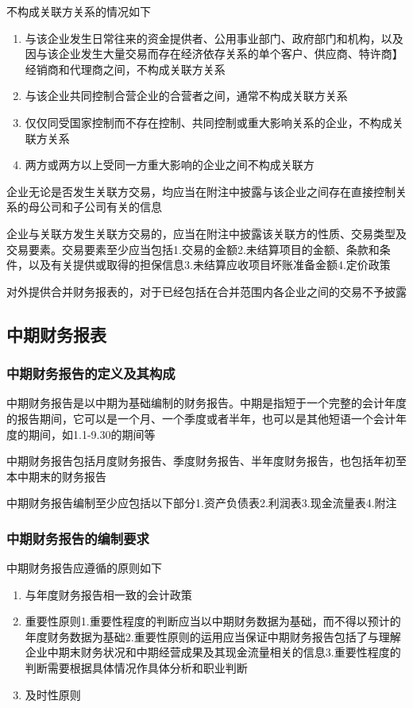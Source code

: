 \documentclass[UTF8,12pt]{ctexart}
\numberwithin{equation}{section} %
\numberwithin{figure}{section}
\numberwithin{table}{section}
\begin{document}
	不构成关联方关系的情况如下
	\begin{enumerate}
		\item 与该企业发生日常往来的资金提供者、公用事业部门、政府部门和机构，以及因与该企业发生大量交易而存在经济依存关系的单个客户、供应商、特许商】经销商和代理商之间，不构成关联方关系
		
		\item 与该企业共同控制合营企业的合营者之间，通常不构成关联方关系
		
		\item 仅仅同受国家控制而不存在控制、共同控制或重大影响关系的企业，不构成关联方关系
		
		\item 两方或两方以上受同一方重大影响的企业之间不构成关联方
	\end{enumerate}
	
	企业无论是否发生关联方交易，均应当在附注中披露与该企业之间存在直接控制关系的母公司和子公司有关的信息
	
	企业与关联方发生关联方交易的，应当在附注中披露该关联方的性质、交易类型及交易要素。交易要素至少应当包括1.交易的金额2.未结算项目的金额、条款和条件，以及有关提供或取得的担保信息3.未结算应收项目坏账准备金额4.定价政策
	
	对外提供合并财务报表的，对于已经包括在合并范围内各企业之间的交易不予披露
	
	\subsection{中期财务报表}
	\subsubsection{中期财务报告的定义及其构成}
	中期财务报告是以中期为基础编制的财务报告。中期是指短于一个完整的会计年度的报告期间，它可以是一个月、一个季度或者半年，也可以是其他短语一个会计年度的期间，如1.1-9.30的期间等
	
	中期财务报告包括月度财务报告、季度财务报告、半年度财务报告，也包括年初至本中期末的财务报告
	
	中期财务报告编制至少应包括以下部分1.资产负债表2.利润表3.现金流量表4.附注
	
	\subsubsection{中期财务报告的编制要求}
	中期财务报告应遵循的原则如下
	\begin{enumerate}
		\item 与年度财务报告相一致的会计政策
		
		\item 重要性原则1.重要性程度的判断应当以中期财务数据为基础，而不得以预计的年度财务数据为基础2.重要性原则的运用应当保证中期财务报告包括了与理解企业中期末财务状况和中期经营成果及其现金流量相关的信息3.重要性程度的判断需要根据具体情况作具体分析和职业判断
		
		\item 及时性原则
	\end{enumerate}
	
\end{document}

